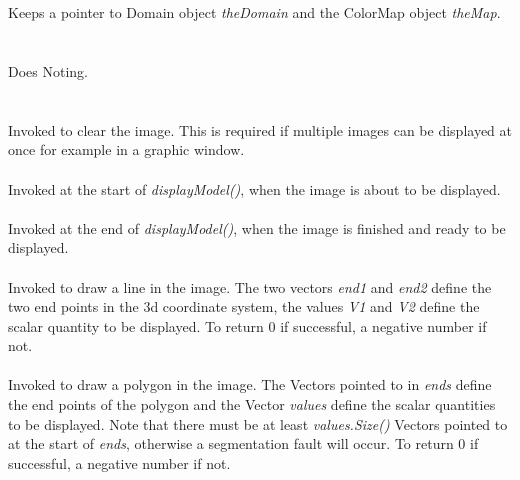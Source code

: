  \\ 
\\ 
Keeps a pointer to Domain object {\em theDomain} and the ColorMap
object {\em theMap}. \\

 \\
\\  
Does Noting. \\

 \\
\\
Invoked to clear the image. This is required if multiple images can be
displayed at once for example in a graphic window. \\

\\
Invoked at the start of {\em displayModel()}, when the image is about
to be displayed. \\

\\
Invoked at the end of {\em displayModel()}, when the image is finished
and ready to be displayed. \\

\\
Invoked to draw a line in the image. The two vectors {\em end1} and
{\em end2} define the two end points in the 3d coordinate system, the
values {\em V1} and {\em V2} define the scalar quantity to be
displayed. To return $0$ if successful, a negative number if not.\\



 \\ 
Invoked to draw a polygon in the image. The Vectors pointed to in {\em
ends} define the end points of the polygon and the Vector {\em values}
define the scalar quantities to be displayed. Note that there must
be at least {\em values.Size()} Vectors pointed to at the start of
{\em ends}, otherwise a segmentation fault will occur. To return $0$
if successful, a negative number if not.\\

